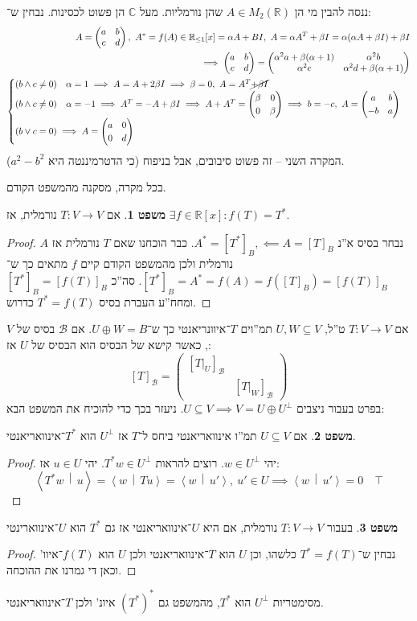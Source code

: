 \documentclass[a4paper]{article}
\newcommand\R     {\mathbb{R}}
\newcommand\C     {\mathbb{C}}
\newcommand\bc    {\mathcal{B}}
\newcommand\ra    {\rangle}
\newcommand\la    {\langle}
\newcommand\co        {\colon}
\newcommand\pms[1]    {\begin{pmatrix}
		#1
\end{pmatrix}}
\newcommand\mut [2]   {\left \la #1 \,\middle\vert\, #2 \right \ra}
\newcommand\ag        {\alpha}
\newcommand\bg        {\beta}
\theoremstyle{definition}
\newtheorem{Theorem}{\color{myblue}משפט}
\newcommand\theo  [1] {\begin{Theorem}#1\end{Theorem}}
\begin{document}
	ננסה להבין מי הן $A \in M_2(\R)$ שהן נורמליות. מעל $\C$ הן פשוט לכסינות. נבחין ש־: 
	\begin{align*}
		A = \pms{a & b \\ c & d}, \ A^* = f(A) \in \R_{\le1}[x] = \ag A + BI, \ A = \ag A^T + \bg I = \ag(\ag A + \bg I) + \bg I \\ \implies \pms{a & b \\ c & d} = \pms{\ag^2 a + \bg(\ag + 1) & \ag^2 b \\ \ag^2 c & \ag^2 d + \bg (\ag + 1)} \\
		\begin{cases}
			(b \land c \neq 0 ) \quad \ag = 1 \implies  A = A + 2 \bg I \implies \bg = 0, \ A = A^T \cancel{+ \bg I} \\
			(b \land c \neq 0) \quad \ag = -1 \implies A^T = - A  +\bg I  \implies A + A^T = \pms{\bg & 0 \\ 0 & \bg} \implies b = -c, \ A = \pms{a & b \\ -b & a} \\
			(b \lor c = 0) \implies A = \pms{a & 0 \\ 0 & d}
		\end{cases}
	\end{align*}
	המקרה השני – זה פשוט סיבובים, אבל בניפוח (כי הדטרמיננטה היא $a^2 - b^2$). 
	
	בכל מקרה, מסקנה מהמשפט הקודם. 
	\theo{אם $T \co V \to V$ נורמלית, אז $\exists f \in \R[x] \co f(T) = T^*$. }
	\begin{proof}
		נבחר בסיס א''נ $A^* = [T^*]_B, \impliedby A = [T]_B$. כבר הוכחנו שאם $T$ נורמלית אז $A$ נורמלית ולכן מהמשפט הקודם קיים $f$ מתאים כך ש־$[T^*]_B = A^* = f(A) = f([T]_B) = [f(T)]_B$. סה''כ $[T^*]_B = [f(T)]_B$ ומחח''ע העברת בסיס $T^* = f(T)$ כדרוש. 
	\end{proof}
	
	אם $T \co V \to V$ ט''ל, $U, W \subseteq V$ תמ''וים $T$־איוונריאנטי כך ש־$U \oplus W = B$. אם $\bc$ בסיס של $V$, כאשר קישא של הבסיס הוא הבסיס של $U$ אז: 
	\[ [T]_\bc = \pms{[T|_U]_\bc &  \\  & [T|_W]_\bc} \]
	בפרט בעבור ניצבים $U \subseteq V \implies V = U \oplus U^{\perp}$. ניעזר בכך כדי להוכיח את המשפט הבא: 
	\theo{אם $U \subseteq V$ תמ''ו אינוואריאנטי ביחס ל־$T$ אז $U^{\perp}$ הוא $T^*$־אינוואריאנטי. }\begin{proof}
		יהי $w \in U^{\perp}$. רוצים להראות $T^*w \in U^{\perp}$. יהי $u \in U$ אז: 
		\[ \mut{T^* w}{u} = \mut{w}{Tu} = \mut{w}{u'}, \ u' \in U \implies \mut{w}{u'} = 0 \quad \top \]
	\end{proof}
	\theo{בעבור $T \co V \to V$ נורמלית, אם היא $U$־אינוואריאנטי אז גם $T^*$ הוא $U$־אינווארינטי}
	\begin{proof}
		נבחין ש־$T^* = f(T)$ כלשהו, וכן $U$ הוא $T$־אינוואריאנטי ולכן $U$ הוא $f(T)$־איוו' וכאן די גמרנו את ההוכחה. 
	\end{proof}
	מסימטריות $U^{\perp}$ הוא $T^*$, מהמשפט גם $(T^*)^*$ איונ' ולכן $T$־אינוואריאנטי. 
	
\end{document}
